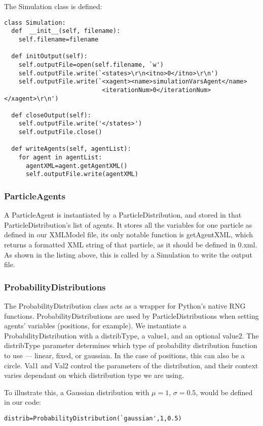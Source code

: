 \documentclass[11pt,a4paper]{article}
\begin{document}
The Simulation class is defined:
\begin{lstlisting}
class Simulation:
  def  __init__(self, filename):
    self.filename=filename

  def initOutput(self):
    self.outputFile=open(self.filename, `w')
    self.outputFile.write(`<states>\r\n<itno>0</itno>\r\n')
    self.outputFile.write(`<xagent><name>simulationVarsAgent</name>
                           <iterationNum>0</iterationNum></xagent>\r\n')

  def closeOutput(self):
    self.outputFile.write('</states>')
    self.outputFile.close()

  def writeAgents(self, agentList):
    for agent in agentList:
      agentXML=agent.getAgentXML()
      self.outputFile.write(agentXML)
\end{lstlisting}

\subsubsection{ParticleAgents}
A ParticleAgent is instantiated by a ParticleDistribution, and stored in that ParticleDistribution's list of agents. It stores all the variables for one particle as defined in our XMLModel file, its only notable function is getAgentXML, which returns a formatted XML string of that particle, as it should be defined in 0.xml. As shown in the listing above, this is called by a Simulation to write the output file.

\subsubsection{ProbabilityDistributions}
The ProbabilityDistribution class acts as a wrapper for Python's native RNG functions. ProbabilityDistributions are used by ParticleDistributions when setting agents' variables (positions, for example). We instantiate a ProbabilityDistribution with a distribType, a value1, and an optional value2. The distribType parameter determines which type of probability distribution function to use --- linear, fixed, or gaussian. In the case of positions, this can also be a circle. Val1 and Val2 control the parameters of the distribution, and their context varies dependant on which distribution type we are using.

To illustrate this, a Gaussian distribution with $\mu=1$, $\sigma=0.5$, would be defined in our code:

\begin{lstlisting}
distrib=ProbabilityDistribution(`gaussian',1,0.5)
\end{lstlisting}
\end{document}
